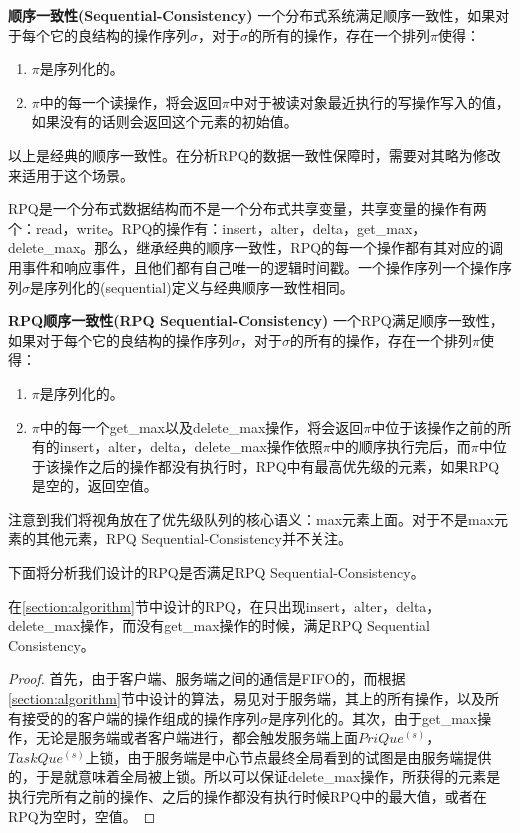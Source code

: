 			\begin{definition}
				\textbf{顺序一致性(Sequential-Consistency)} 一个分布式系统满足顺序一致性，如果对于每个它的良结构的操作序列$\sigma$，对于$\sigma$的所有的操作，存在一个排列$\pi$使得：
				\begin{enumerate}
					\item $\pi$是序列化的。
					\item $\pi$中的每一个读操作，将会返回$\pi$中对于被读对象最近执行的写操作写入的值，如果没有的话则会返回这个元素的初始值。
				\end{enumerate}
			\end{definition}
			\par 以上是经典的顺序一致性。在分析RPQ的数据一致性保障时，需要对其略为修改来适用于这个场景。
			\par RPQ是一个分布式数据结构而不是一个分布式共享变量，共享变量的操作有两个：read，write。RPQ的操作有：insert，alter，delta，get\_max，delete\_max。那么，继承经典的顺序一致性，RPQ的每一个操作都有其对应的调用事件和响应事件，且他们都有自己唯一的逻辑时间戳。一个操作序列一个操作序列$\sigma$是序列化的(sequential)定义与经典顺序一致性相同。
			\begin{definition}
				\textbf{RPQ顺序一致性(RPQ Sequential-Consistency)} 一个RPQ满足顺序一致性，如果对于每个它的良结构的操作序列$\sigma$，对于$\sigma$的所有的操作，存在一个排列$\pi$使得：
				\begin{enumerate}
					\item $\pi$是序列化的。
					\item $\pi$中的每一个get\_max以及delete\_max操作，将会返回$\pi$中位于该操作之前的所有的insert，alter，delta，delete\_max操作依照$\pi$中的顺序执行完后，而$\pi$中位于该操作之后的操作都没有执行时，RPQ中有最高优先级的元素，如果RPQ是空的，返回空值。
				\end{enumerate}
			\end{definition}
			\par 注意到我们将视角放在了优先级队列的核心语义：max元素上面。对于不是max元素的其他元素，RPQ Sequential-Consistency并不关注。
			\par 下面将分析我们设计的RPQ是否满足RPQ Sequential-Consistency。 
			\begin{theorem}
				在\ref{section:algorithm}节中设计的RPQ，在只出现insert，alter，delta，delete\_max操作，而没有get\_max操作的时候，满足RPQ Sequential Consistency。
			\end{theorem}
			\begin{proof}
				首先，由于客户端、服务端之间的通信是FIFO的，而根据\ref{section:algorithm}节中设计的算法，易见对于服务端，其上的所有操作，以及所有接受的的客户端的操作组成的操作序列$\sigma$是序列化的。其次，由于get\_max操作，无论是服务端或者客户端进行，都会触发服务端上面$PriQue^{(s)}$，$TaskQue^{(s)}$上锁，由于服务端是中心节点最终全局看到的试图是由服务端提供的，于是就意味着全局被上锁。所以可以保证delete\_max操作，所获得的元素是执行完所有之前的操作、之后的操作都没有执行时候RPQ中的最大值，或者在RPQ为空时，空值。
			\end{proof}
